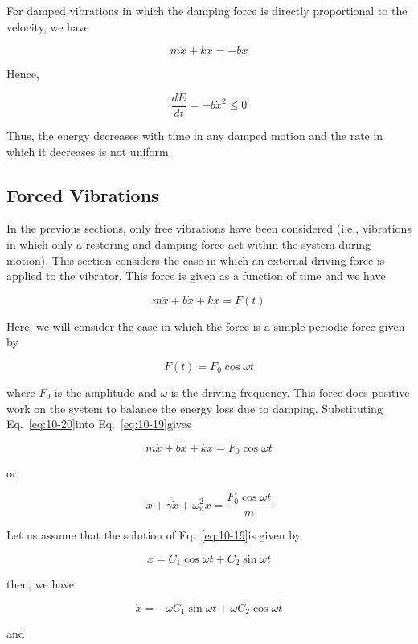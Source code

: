\documentclass[10pt]{article}
\numberwithin{equation}{section}
\begin{document}
For damped vibrations in which the damping force is directly proportional to the velocity, we have

$$
m \ddot{x}+k x=-b \dot{x}
$$

Hence,

$$
\frac{d E}{d t}=-b \dot{x}^{2} \leq 0
$$

Thus, the energy decreases with time in any damped motion and the rate in which it decreases is not uniform.

\subsection{Forced Vibrations}\label{sec:10-5}
In the previous sections, only free vibrations have been considered (i.e., vibrations in which only a restoring and damping force act within the system during motion). This section considers the case in which an external driving force is applied to the vibrator. This force is given as a function of time and we have


\begin{equation}
m \ddot{x}+b \dot{x}+k x=F(t) \label{eq:10-19}
\end{equation}


Here, we will consider the case in which the force is a simple periodic force given by


\begin{equation}
F(t)=F_{0} \cos \omega t \label{eq:10-20}
\end{equation}


where $F_{0}$ is the amplitude and $\omega$ is the driving frequency. This force does positive work on the system to balance the energy loss due to damping. Substituting Eq.~\eqref{eq:10-20}into Eq.~\eqref{eq:10-19}gives


\begin{equation}
m \ddot{x}+b \dot{x}+k x=F_{0} \cos \omega t \label{eq:10-21}
\end{equation}


or

$$
\ddot{x}+\gamma \dot{x}+\omega_{n}^{2} x=\frac{F_{0} \cos \omega t}{m}
$$

Let us assume that the solution of Eq.~\eqref{eq:10-19}is given by

$$
x=C_{1} \cos \omega t+C_{2} \sin \omega t
$$

then, we have

$$
\dot{x}=-\omega C_{1} \sin \omega t+\omega C_{2} \cos \omega t
$$

and
\end{document}
